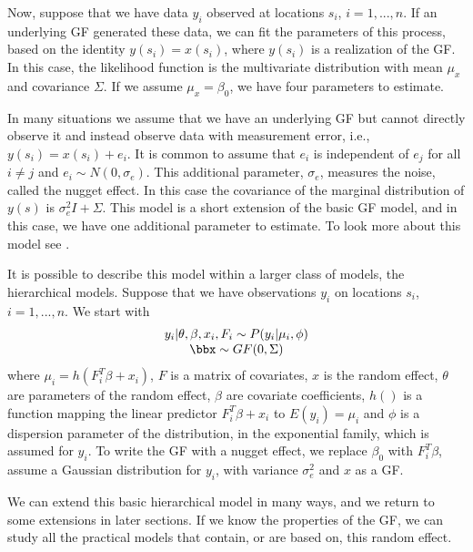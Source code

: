 Now, suppose that we have data $y_i$ observed at 
locations $s_i$, $i=1,...,n$. 
If an underlying GF generated these data, we can fit the 
parameters of this process, based on the identity 
$y(s_i) = x(s_i)$, where $y(s_i)$ is a 
realization of the GF. 
In this case, the likelihood function 
is the multivariate distribution with 
mean $\mu_x$ and covariance $\Sigma$. 
If we assume $\mu_x = \beta_0$, 
we have four parameters to estimate. 

In many situations we assume that we have an underlying 
GF but cannot directly observe it and instead observe 
data with measurement error, i.e., 
$y(s_i) = x(s_i) + e_i$. 
It is common to assume that $e_i$ is 
independent of $e_j$ for all $i\neq j$ and 
$e_i \sim N(0, \sigma_e)$. 
This additional parameter, $\sigma_e$, measures 
the noise, called the nugget effect. 
In this case the covariance of the marginal distribution 
of $y(s)$ is $\sigma^2_eI + \Sigma$. 
This model is a short extension of the basic GF model, 
and in this case, we have one additional parameter 
to estimate. 
To look more about this model 
see \cite{diggleribeiro:2007}. 

It is possible to describe this model within a 
larger class of models, the hierarchical models. 
Suppose that we have observations $y_i$ on locations 
$s_i$, $i=1,...,n$. We start with 
\begin{equation}\begin{array}{c}
y_i|\theta,\beta,x_i,F_i \sim P(y_i|\mu_i,\phi) \\
\bbx \sim GF(0, \Sigma)
\end{array}\end{equation}
where $\mu_i = h(F_i^{T}\beta + x_i)$, 
$F$ is a matrix of covariates, 
$x$ is the random effect, 
$\theta$ are parameters of the random effect, 
$\beta$ are covariate coefficients, 
$h()$ is a function mapping the linear predictor 
$F_i^{T}\beta + x_i$ to $E(y_i) = \mu_i$ and 
$\phi$ is a dispersion parameter of the distribution, 
in the exponential family, which is assumed for $y_i$. 
To write the GF with a nugget effect, 
we replace $\beta_0$ with $F_i^{T}\beta$, 
assume a Gaussian distribution for $y_i$, with 
variance $\sigma_e^2$ and $x$ as a GF.

We can extend this basic hierarchical model in many ways,
and we return to some extensions in later sections. 
If we know the properties of the GF, 
we can study all the practical models 
that contain, or are based on, this random effect. 

